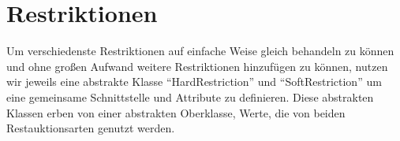 \section{Restriktionen}\label{sec:restrictions}
Um verschiedenste Restriktionen auf einfache Weise gleich behandeln zu können
und ohne großen Aufwand weitere Restriktionen hinzufügen zu können,
nutzen wir jeweils eine abstrakte Klasse \enquote{HardRestriction} und \enquote{SoftRestriction}
um eine gemeinsame Schnittstelle und Attribute zu definieren.
Diese abstrakten Klassen erben von einer abstrakten Oberklasse, Werte, die von beiden Restauktionsarten genutzt werden.



